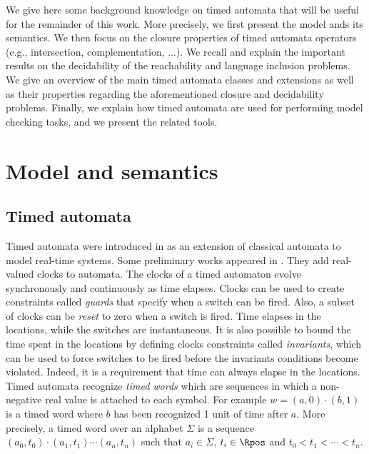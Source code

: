 
We give here some background knowledge on timed automata that will be useful for the remainder of this work. More precisely, we first present the model ands its semantics. We then focus on the closure properties of timed automata operators (e.g., intersection, complementation, ...). We recall and explain the important results on the decidability of the reachability and language inclusion problems. We give an overview of the main timed automata classes and extensions as well as their properties regarding the aforementioned closure and decidability problems. Finally, we explain how timed automata are used for performing model checking tasks, and we present the related tools.\\


\section{Model and semantics}


\subsection{Timed automata}


Timed automata were introduced in \cite{RADLD94} as an extension of classical automata \cite{Hopcroft79} to model real-time systems. Some preliminary works appeared in \cite{RACC94}. They add real-valued clocks to automata. The clocks of a timed automaton evolve synchronously and continuously as time elapses. Clocks can be used to create constraints called \emph{guards} that specify when a switch can be fired. Also, a subset of clocks can be \emph{reset} to zero when a switch is fired. Time elapses in the locations, while the switches are instantaneous. It is also possible to bound the time spent in the locations by defining clocks constraints called \emph{invariants}, which can be used to force switches to be fired before the invariants conditions become violated. Indeed, it is a requirement that time can always elapse in the locations. Timed automata recognize \emph{timed words} which are sequences in which a non-negative real value is attached to each symbol. For example $w = (a, 0) \cdot (b, 1)$ is a timed word where $b$ has been recognized 1 unit of time after $a$. More precisely, a timed word over an alphabet $\Sigma$ is a sequence $(a_0,t_0) \cdot (a_1, t_1) \cdots (a_n, t_n)$ such that $a_i \in \Sigma$,  $t_i \in \Rpos$ and  $t_0 < t_1 < \cdots < t_n$.\\


